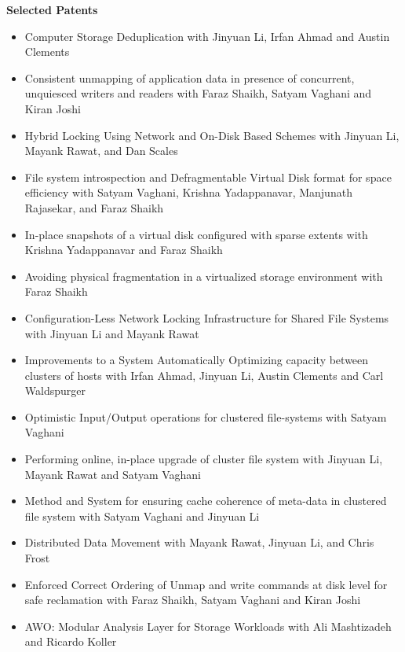 \documentclass{article}
\begin{document}
\vspace*{-0.1truein}
\large \textbf{Selected Patents}
  \small
\vspace*{-0.2truein}
  \begin{center}
  \begin{itemize}
  \item {Computer Storage Deduplication with Jinyuan Li, Irfan Ahmad and Austin Clements}
  \item {Consistent unmapping of application data in presence of concurrent,
        unquiesced writers and readers with Faraz Shaikh, Satyam Vaghani and
     Kiran Joshi}
  \item {Hybrid Locking Using Network and On-Disk Based Schemes with Jinyuan
         Li, Mayank Rawat, and Dan Scales}
  \item {File system introspection and Defragmentable Virtual Disk
        format for space efficiency with Satyam Vaghani, Krishna Yadappanavar, Manjunath Rajasekar,
        and Faraz Shaikh}
   \item {In-place snapshots of a virtual disk configured with sparse extents
      with Krishna Yadappanavar and Faraz Shaikh}
   \item {Avoiding physical fragmentation in a virtualized storage environment
      with Faraz Shaikh}
  \item {Configuration-Less Network Locking Infrastructure for Shared
        File Systems with Jinyuan Li and Mayank Rawat}
  \item {Improvements to a System Automatically Optimizing capacity
        between clusters of hosts with Irfan Ahmad, Jinyuan Li, Austin Clements and Carl Waldspurger}
  \item {Optimistic Input/Output operations for clustered file-systems with Satyam Vaghani}
  \item {Performing online, in-place upgrade of cluster file system with Jinyuan Li, Mayank Rawat and
        Satyam Vaghani}
  \item {Method and System for ensuring cache coherence of meta-data in clustered file system with Satyam Vaghani and Jinyuan Li}
  \item {Distributed Data Movement with Mayank Rawat, Jinyuan Li, and Chris Frost}
  \item {Enforced Correct Ordering of Unmap and write commands at disk level for safe reclamation with Faraz Shaikh, Satyam Vaghani and
         Kiran Joshi}
  \item {AWO: Modular Analysis Layer for Storage Workloads with Ali Mashtizadeh and Ricardo Koller}
  \end{itemize}
  \end{center}
\end{document}
